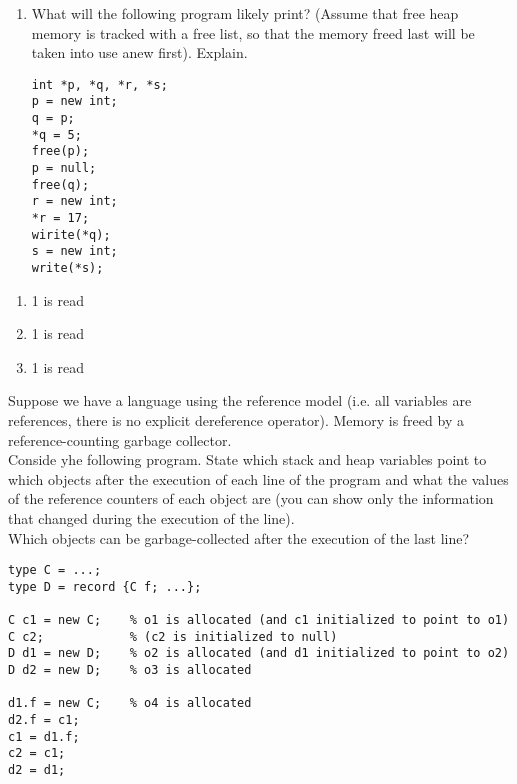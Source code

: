 \documentclass[11pt]{exam}
\begin{document}
\begin{questions}
\begin{enumerate}[label=(\roman*)]
            \item What will the following program likely print? (Assume that free heap memory is tracked with a free list, so that the memory freed last will be taken into use anew first). Explain.
\begin{lstlisting}
int *p, *q, *r, *s;
p = new int;
q = p;
*q = 5;
free(p);
p = null;
free(q);
r = new int;
*r = 17;
wirite(*q);
s = new int;
write(*s);
\end{lstlisting}
        \end{enumerate}

	\begin{framed}


	\end{framed}

        \begin{enumerate}[label=(\roman*)]
            \item 1 is read
                \begin{framed}
                \end{framed}
            \item 1 is read
                \begin{framed}
                \end{framed}
            \item 1 is read
                \begin{framed}
                \end{framed}
        \end{enumerate}


      \question Suppose we have a language using the reference model (i.e. all variables are references, there is no explicit dereference operator). Memory is freed by a reference-counting garbage collector.\\
        Conside yhe following program. State which stack and heap variables point to which objects after the execution of each line of the program and what the values of the reference counters of each object are (you can show only the information that changed during the execution of the line).\\
        Which objects can be garbage-collected after the execution of the last line?

\begin{lstlisting}
type C = ...;
type D = record {C f; ...};

C c1 = new C;    % o1 is allocated (and c1 initialized to point to o1)
C c2;            % (c2 is initialized to null)
D d1 = new D;    % o2 is allocated (and d1 initialized to point to o2)
D d2 = new D;    % o3 is allocated

d1.f = new C;    % o4 is allocated
d2.f = c1;
c1 = d1.f;
c2 = c1;
d2 = d1;
\end{lstlisting}

	\begin{framed}


	\end{framed}

\end{questions}
\end{document}
